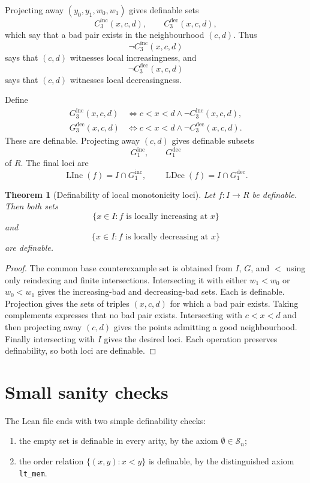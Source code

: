 \documentclass[11pt]{article}
\newtheorem{theorem}[definition]{Theorem}
\newcommand{\LInc}{\operatorname{LInc}}
\newcommand{\LDec}{\operatorname{LDec}}
\begin{document}
Projecting away $(y_0,y_1,w_0,w_1)$ gives definable sets
\[
  C^{\mathrm{inc}}_3(x,c,d),
  \qquad
  C^{\mathrm{dec}}_3(x,c,d),
\]
which say that a bad pair exists in the neighbourhood $(c,d)$.
Thus
\[
  \neg C^{\mathrm{inc}}_3(x,c,d)
\]
says that $(c,d)$ witnesses local increasingness, and
\[
  \neg C^{\mathrm{dec}}_3(x,c,d)
\]
says that $(c,d)$ witnesses local decreasingness.

Define
\begin{align*}
  G^{\mathrm{inc}}_3(x,c,d)
  &\Longleftrightarrow c<x<d\land\neg C^{\mathrm{inc}}_3(x,c,d),\\
  G^{\mathrm{dec}}_3(x,c,d)
  &\Longleftrightarrow c<x<d\land\neg C^{\mathrm{dec}}_3(x,c,d).
\end{align*}
These are definable. Projecting away $(c,d)$ gives definable subsets
\[
  G^{\mathrm{inc}}_1,
  \qquad
  G^{\mathrm{dec}}_1
\]
of $R$. The final loci are
\[
  \LInc(f)=I\cap G^{\mathrm{inc}}_1,
  \qquad
  \LDec(f)=I\cap G^{\mathrm{dec}}_1.
\]

\begin{theorem}[Definability of local monotonicity loci]
Let $f:I\to R$ be definable. Then both sets
\[
  \{x\in I:f\text{ is locally increasing at }x\}
\]
and
\[
  \{x\in I:f\text{ is locally decreasing at }x\}
\]
are definable.
\end{theorem}

\begin{proof}
The common base counterexample set is obtained from $I$, $G$, and $<$ using only reindexing and finite intersections. Intersecting it with either $w_1<w_0$ or $w_0<w_1$ gives the increasing-bad and decreasing-bad sets. Each is definable. Projection gives the sets of triples $(x,c,d)$ for which a bad pair exists. Taking complements expresses that no bad pair exists. Intersecting with $c<x<d$ and then projecting away $(c,d)$ gives the points admitting a good neighbourhood. Finally intersecting with $I$ gives the desired loci. Each operation preserves definability, so both loci are definable.
\end{proof}

\section{Small sanity checks}

The Lean file ends with two simple definability checks:
\begin{enumerate}[label=(\roman*)]
  \item the empty set is definable in every arity, by the axiom $\emptyset\in\mathcal S_n$;
  \item the order relation $\{(x,y):x<y\}$ is definable, by the distinguished axiom \texttt{lt\_mem}.
\end{enumerate}
\end{document}
